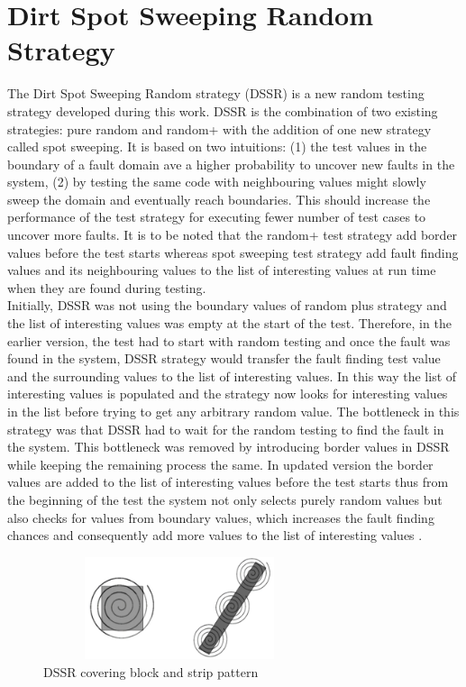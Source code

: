 \documentclass[10pt, conference, compsocconf]{IEEEtran}
\begin{document}
\section{Dirt Spot Sweeping Random Strategy}\label{sec:DSSR}

The Dirt Spot Sweeping Random strategy (DSSR) is a new random testing strategy developed during this work. DSSR is the combination of two existing strategies: pure random and random+ with the addition of one new strategy called spot sweeping. It is based on two intuitions: (1) the test values in the boundary of a fault domain ave a higher probability to uncover new faults in the system, (2) by testing the same code with neighbouring values might slowly sweep the domain and eventually reach boundaries. This should increase the performance of the test strategy for executing fewer number of test cases to uncover more faults. It is to be noted that the random+ test strategy add border values before the test starts whereas spot sweeping test strategy add fault finding values and its neighbouring values to the list of interesting values at run time when they are found during testing.\\

Initially, DSSR was not using the boundary values of random plus strategy and the list of interesting values was empty at the start of the test. Therefore, in the earlier version, the test had to start with random testing and once the fault was found in the system, DSSR strategy would transfer the fault finding test value and the surrounding values to the list of interesting values. In this way the list of interesting values is populated and the strategy now looks for interesting values in the list before trying to get any arbitrary random value. The bottleneck in this strategy was that DSSR had to wait for the random testing to find the fault in the system. This bottleneck was removed by introducing border values in DSSR while keeping the remaining process the same. In updated version the border values are added to the list of interesting values before the test starts thus from the beginning of the test the system not only selects purely random values but also checks for values from boundary values, which increases the fault finding chances and consequently add more values to the list of interesting values \cite{Kaner2004}.\\

\begin{figure}[htp]
\centering
\includegraphics[width=8cm,height=3cm]{block2.png}
\caption{DSSR covering block and strip pattern}
\label{fig:block2}
\end{figure}
\end{document}
